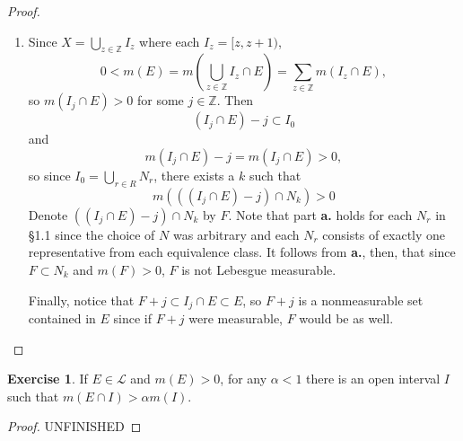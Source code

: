 \documentclass{article}
\theoremstyle{definition}
\newtheorem{ex}{Exercise}
\begin{document}
\begin{proof}
\begin{enumerate}[label=\textbf{\alph*.}]
\begin{equation*}
			      m \left(\bigcup_{r \in R} E_r \right) = \sum_{r \in R} m \left( E_r \right) = \sum_{r \in R} m(E).
		      \end{equation*}
		      Clearly, the final expression above cannot be finite unless $m(E) = 0$, so since it is forced to be $\leq 1$ (i.e. finite), in fact $m(E) = 0$.
		\item Since $X = \bigcup_{z \in \mathbb{Z}} I_z$ where each $I_z = [z, z+1)$, \begin{equation*}
			      0 < m(E) = m \left( \bigcup_{z \in \mathbb{Z}} I_z \cap E \right) = \sum_{z \in \mathbb{Z}} m(I_z \cap E),
		      \end{equation*}
		      so $m(I_j \cap E) > 0$ for some $j \in \mathbb{Z}$.
		      Then \begin{equation*}
			      \left( I_j \cap E \right) - j \subset I_0
		      \end{equation*}
		      and \begin{equation*}
			      m \left( I_j \cap E \right) - j = m \left( I_j \cap E \right) > 0,
		      \end{equation*}
		      so since $I_0 = \bigcup_{r \in R} N_r$, there exists a $k$ such that \begin{equation*}
			      m \left( \left( \left( I_j \cap E \right) - j \right) \cap N_k \right) > 0
		      \end{equation*}
          Denote $\left( \left( I_j \cap E \right) - j \right) \cap N_k$ by $F$.
		      Note that part \textbf{a.} holds for each $N_r$ in \S 1.1 since the choice of $N$ was arbitrary and each $N_r$ consists of exactly one representative from each equivalence class.
          It follows from \textbf{a.}, then, that since $F \subset N_k$ and $m(F) > 0$, $F$ is not Lebesgue measurable.

          Finally, notice that $F + j \subset I_j \cap E \subset E$, so $F + j$ is a nonmeasurable set contained in $E$ since if $F + j$ were measurable, $F$ would be as well.
	\end{enumerate}
\end{proof}

\begin{ex}
  If $E \in \mathcal{L}$ and $m(E) > 0$, for any $\alpha < 1$ there is an open interval $I$ such that $m(E \cap I) > \alpha m(I)$.
\end{ex}
\begin{proof}
  UNFINISHED
\end{proof}
\end{document}
